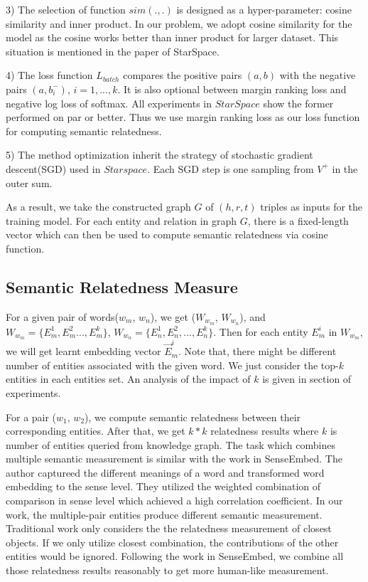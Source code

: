 3) The selection of function $sim(.,.)$ is designed as a hyper-parameter: cosine similarity and inner product.
In our problem, we adopt cosine similarity for the model as the cosine works better than inner product for
larger dataset. This situation is mentioned in the paper of StarSpace.

4) The loss function $L_{batch}$ compares the positive pairs $(a,b)$ with the negative pairs $(a, b_i^-)$, $i=1,...,k$.
It is also optional between margin ranking loss and negative log loss of softmax. All experiments in $StarSpace$ show
the former performed on par or better. Thus we use margin ranking loss as our loss function for computing semantic relatedness.

5) The method optimization inherit the strategy of stochastic gradient descent(SGD) used in $Starspace$. Each SGD step is one
sampling from $V^+$ in the outer sum.

As a result, we take the constructed graph $G$ of $(h, r, t)$ triples as inputs for the training model.
For each entity and relation in graph $G$, there is a fixed-length vector which can
then be used to compute semantic relatedness via cosine function.



\subsection{Semantic Relatedness Measure}
\label{sec:measure}
For a given pair of words($w_m$, $w_n$), we get ($W_{w_m}$, $W_{w_n}$), and $W_{w_m}=\{E_m^1,E_m^2...,E_m^k\}$,
$W_{w_n}=\{E_n^1,E_n^2,...,E_n^k\}$. Then for each entity $E_m^i$ in $W_{w_m}$, we will get learnt embedding vector
$\overrightarrow E_m^i$.
Note that, there might be different number of entities associated with the given
word. We just consider the top-$k$ entities in each entities set. An analysis of the impact of $k$ is
given in section of experiments.

For a pair ($w_1$, $w_2$), we compute semantic relatedness between their corresponding entities. After that, we
get $k*k$ relatedness results where $k$ is number of entities queried from knowledge graph.
The task which combines multiple semantic measurement is similar with the work in SenseEmbed\cite{acl/IacobacciPN15}.
The author captureed the different meanings of a word and transformed word embedding to the sense level.
They utilized the weighted combination of comparison in sense level which achieved a high correlation coefficient.
In our work, the multiple-pair entities produce different semantic measurement. Traditional work only considers the
the relatedness measurement of closest objects. If we only utilize closest combination, the contributions of the other
entities would be ignored. Following the work in SenseEmbed, we combine all those relatedness
results reasonably to get more human-like measurement.

